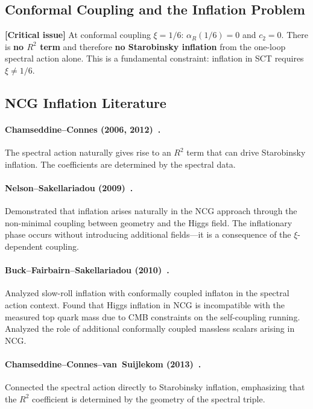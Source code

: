 \documentclass[11pt,a4paper]{article}
\theoremstyle{plain}
\theoremstyle{definition}
\newcommand{\signcorrection}[1]{%
  \par\smallskip\noindent
  \colorbox{red!10}{\parbox{\dimexpr\linewidth-2\fboxsep}{%
    \textcolor{red!60!black}{\textbf{[Critical issue]}} #1}}%
  \par\smallskip}
\begin{document}
\subsection{Conformal Coupling and the Inflation Problem}

\signcorrection{At conformal coupling $\xi = 1/6$:
$\alpha_R(1/6) = 0$ and $c_2 = 0$.
There is \textbf{no $R^2$ term} and therefore \textbf{no Starobinsky
inflation} from the one-loop spectral action alone. This is a
fundamental constraint: inflation in SCT requires $\xi \neq 1/6$.}

\subsection{NCG Inflation Literature}

\paragraph{Chamseddine--Connes (2006, 2012)~\cite{CC06,CC12}.}
The spectral action naturally gives rise to an $R^2$ term that can
drive Starobinsky inflation. The coefficients are determined by the
spectral data.

\paragraph{Nelson--Sakellariadou (2009)~\cite{NS09}.}
Demonstrated that inflation arises naturally in the NCG approach
through the non-minimal coupling between geometry and the Higgs field.
The inflationary phase occurs without introducing additional
fields---it is a consequence of the $\xi$-dependent coupling.

\paragraph{Buck--Fairbairn--Sakellariadou (2010)~\cite{BFS10}.}
Analyzed slow-roll inflation with conformally coupled inflaton in the
spectral action context. Found that Higgs inflation in NCG is
incompatible with the measured top quark mass due to CMB constraints
on the self-coupling running. Analyzed the role of additional
conformally coupled massless scalars arising in NCG.

\paragraph{Chamseddine--Connes--van~Suijlekom (2013)~\cite{CCS13}.}
Connected the spectral action directly to Starobinsky inflation,
emphasizing that the $R^2$ coefficient is determined by the geometry
of the spectral triple.
\end{document}
